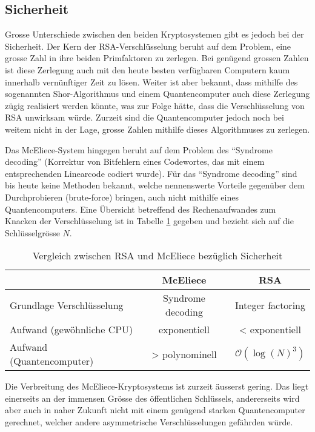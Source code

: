 \subsection{Sicherheit}
Grosse Unterschiede zwischen den beiden Kryptosystemen gibt es jedoch bei der Sicherheit.
Der Kern der RSA-Verschlüsselung beruht auf dem Problem, eine grosse Zahl in ihre beiden Primfaktoren zu zerlegen.
Bei genügend grossen Zahlen ist diese Zerlegung auch mit den heute besten verfügbaren Computern kaum innerhalb vernünftiger Zeit zu lösen.
Weiter ist aber bekannt,
dass mithilfe des sogenannten Shor-Algorithmus \cite{mceliece:shor} und einem Quantencomputer auch diese Zerlegung zügig realisiert werden könnte,
was zur Folge hätte, dass die Verschlüsselung von RSA unwirksam würde.
Zurzeit sind die Quantencomputer jedoch noch bei weitem nicht in der Lage, grosse Zahlen mithilfe dieses Algorithmuses zu zerlegen.

Das McEliece-System hingegen beruht auf dem Problem des ``Syndrome decoding'' (Korrektur von Bitfehlern eines Codewortes, das mit einem entsprechenden Linearcode codiert wurde).
Für das ``Syndrome decoding'' sind bis heute keine Methoden bekannt,
welche nennenswerte Vorteile gegenüber dem Durchprobieren (brute-force) bringen,
auch nicht mithilfe eines Quantencomputers.
Eine Übersicht betreffend des Rechenaufwandes zum Knacken der Verschlüsselung ist in Tabelle \ref{mceliece:tab:comparison_security} gegeben und bezieht sich auf die Schlüsselgrösse $N$.
\begin{table}
    \begin{center}
        \begin{tabular}{l|c|c}
                                    &McEliece          &RSA              \\
        \hline
            Grundlage Verschlüsselung &Syndrome decoding &Integer factoring\\
            Aufwand (gewöhnliche CPU) &exponentiell       &< exponentiell    \\
            Aufwand (Quantencomputer) &> polynominell      &$\mathcal{O}(\log(N)^3)$
        \end{tabular}
    \end{center}
    \caption{\label{mceliece:tab:comparison_security}Vergleich zwischen RSA und McEliece bezüglich Sicherheit}
\end{table}

Die Verbreitung des McEliece-Kryptosystems ist zurzeit äusserst gering.
Das liegt einerseits an der immensen Grösse des öffentlichen Schlüssels,
andererseits wird aber auch in naher Zukunft nicht mit einem genügend starken Quantencomputer gerechnet,
welcher andere asymmetrische Verschlüsselungen gefährden würde.
